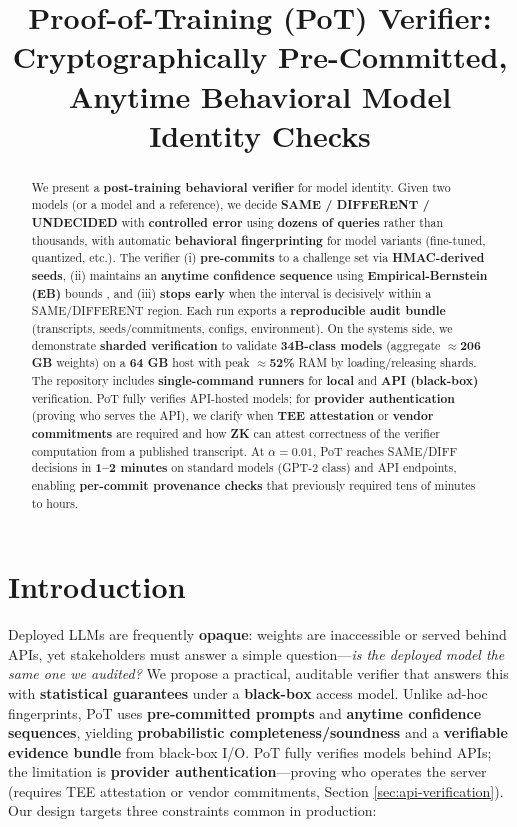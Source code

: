 \documentclass{article}
\title{Proof-of-Training (PoT) Verifier: Cryptographically Pre-Committed,\\
Anytime Behavioral Model Identity Checks}
\date{}
\begin{document}
\maketitle

\begin{abstract}
We present a \textbf{post-training behavioral verifier} for model identity. Given two models (or a model and a reference), we decide \textbf{SAME / DIFFERENT / UNDECIDED} with \textbf{controlled error} using \textbf{dozens of queries} rather than thousands, with automatic \textbf{behavioral fingerprinting} for model variants (fine-tuned, quantized, etc.). The verifier (i) \textbf{pre-commits} to a challenge set via \textbf{HMAC-derived seeds}, (ii) maintains an \textbf{anytime confidence sequence} using \textbf{Empirical-Bernstein (EB)} bounds \cite{maurer2009empiricalbernstein,howard2021timeuniform,howard2021confidenceSequences}, and (iii) \textbf{stops early} when the interval is decisively within a SAME/DIFFERENT region. Each run exports a \textbf{reproducible audit bundle} (transcripts, seeds/commitments, configs, environment). On the systems side, we demonstrate \textbf{sharded verification} to validate \textbf{34B-class models} (aggregate $\approx$\textbf{206 GB} weights) on a \textbf{64 GB} host with peak $\approx$\textbf{52\%} RAM by loading/releasing shards. The repository includes \textbf{single-command runners} for \textbf{local} and \textbf{API (black-box)} verification. PoT fully verifies API-hosted models; for \textbf{provider authentication} (proving who serves the API), we clarify when \textbf{TEE attestation} or \textbf{vendor commitments} are required and how \textbf{ZK} can attest correctness of the verifier computation from a published transcript. At $\alpha=0.01$, PoT reaches SAME/DIFF decisions in \textbf{1--2 minutes} on standard models (GPT-2 class) and API endpoints, enabling \textbf{per-commit provenance checks} that previously required tens of minutes to hours.
\end{abstract}

\section{Introduction}

Deployed LLMs are frequently \textbf{opaque}: weights are inaccessible or served behind APIs, yet stakeholders must answer a simple question---\emph{is the deployed model the same one we audited?} We propose a practical, auditable verifier that answers this with \textbf{statistical guarantees} under a \textbf{black-box} access model. Unlike ad-hoc fingerprints, PoT uses \textbf{pre-committed prompts} and \textbf{anytime confidence sequences}, yielding \textbf{probabilistic completeness/soundness} and a \textbf{verifiable evidence bundle} from black-box I/O. PoT fully verifies models behind APIs; the limitation is \textbf{provider authentication}---proving who operates the server (requires TEE attestation or vendor commitments, Section \ref{sec:api-verification}). Our design targets three constraints common in production:
\end{document}
